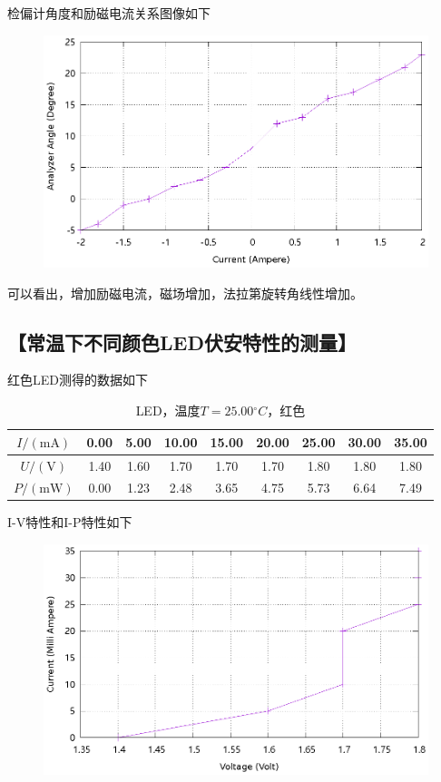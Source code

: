 \documentclass{ctexart}
\newcommand{\si}[1]{\mathrm{#1}}
\let\oldsubsection\subsection
\renewcommand{\subsection}[1]{\oldsubsection{\!\!\!\!\!\!【#1】}}
\begin{document}
检偏计角度和励磁电流关系图像如下

\begin{figure}[H]
    \centering
    \includegraphics[width=\linewidth]{optics-figures/light-intensity-analyzer-angle.gnuplot}
\end{figure}

可以看出，增加励磁电流，磁场增加，法拉第旋转角线性增加。  

\newpage

\subsection{常温下不同颜色LED伏安特性的测量}

红色LED测得的数据如下

\begin{table}[H]
  \centering
  \begin{tabular}{|c|c|c|c|c|c|c|c|c|}
    \hline
    $I/(\si{mA})$   & 0.00 & 5.00 & 10.00 & 15.00 & 20.00 & 25.00 & 30.00 & 35.00 \\\hline
    $U / (\si{V})$  & 1.40 & 1.60 & 1.70 & 1.70 & 1.70 & 1.80 & 1.80 & 1.80 \\\hline
    $P / (\si{mW})$ & 0.00 & 1.23 & 2.48 & 3.65 & 4.75 & 5.73 & 6.64 & 7.49 \\\hline
  \end{tabular}
  \caption{LED，温度$T=25.00{}^{\circ}C$，红色}
\end{table}

I-V特性和I-P特性如下

\begin{figure}[H]
  \centering
  \includegraphics[width=0.8\linewidth]{optics-figures/led-vc-1.gnuplot}
\end{figure}
\end{document}

